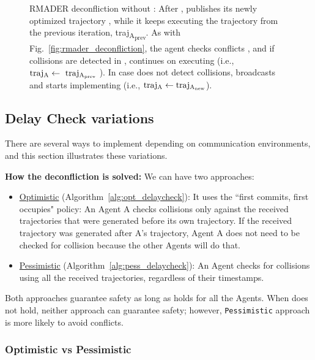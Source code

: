 \begin{figure}[h]
{\begin{tikzpicture}
    \end{tikzpicture}
    }
    
  \caption[RMADER without Check trajectory deconfliction]{RMADER deconfliction without \CheckStep{}: After \OStepA, \AgentA{} publishes its newly optimized trajectory \trajANew, while it keeps executing the trajectory from the previous iteration, traj\textsubscript{A\textsubscript{prev}}. As with Fig.~\ref{fig:rmader_deconfliction}, the agent checks conflicts \DCStepA{}, and if collisions are detected in \DCStepA{}, \AgentA{} continues on executing \trajAPrev{} (i.e., $\text{\trajA{}}\leftarrow \text{\trajAPrev{}}$). In case \DCStepA{} does not detect collisions, \AgentA{} broadcasts and starts implementing \trajANew{} (i.e., $\text{\trajA{}}\leftarrow \text{\trajANew{}}$).}
  \label{fig:wo_check_rmader_deconfliction}
\end{figure}

\subsection{Delay Check variations}

There are several ways to implement \DelayCheckStep{} depending on communication environments, and this section illustrates these variations.

\textbf{How the deconfliction is solved:} We can have two approaches:
\begin{itemize}
    \item \underline{Optimistic} (Algorithm~\ref{alg:opt_delaycheck}): It uses the ``first commits, first occupies" policy: An Agent A checks collisions only against the received trajectories that were generated before its own trajectory. If the received trajectory was generated after A's trajectory, Agent A does not need to be checked for collision because the other Agents will do that. 
    \item \underline{Pessimistic} (Algorithm~\ref{alg:pess_delaycheck}): An Agent checks for collisions using all the received trajectories, regardless of their timestamps. 
\end{itemize}

Both approaches guarantee safety as long as \NeccessaryCond{} holds for all the Agents. When \NeccessaryCond{} does not hold, neither approach can guarantee safety; however, {\tt Pessimistic} approach is more likely to avoid conflicts.

\subsubsection{Optimistic vs Pessimistic}

